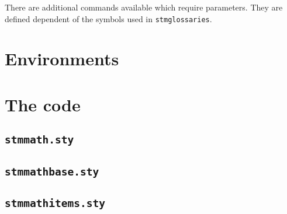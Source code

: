 \documentclass[%
  type=article,%
  layout=koma,%
  date=true,%
  hyperref=true,%
  listings=true,%
  math=true,%
]{stmtext}
\begin{document}
There are additional commands available which require parameters. They are defined dependent of the symbols used in \texttt{stmglossaries}.

\section{Environments}

\newpage

\appendix

\newpage
\section{The code}

\subsection{\protect\texttt{stmmath.sty}}



\subsection{\protect\texttt{stmmathbase.sty}}



\subsection{\protect\texttt{stmmathitems.sty}}


\end{document}
